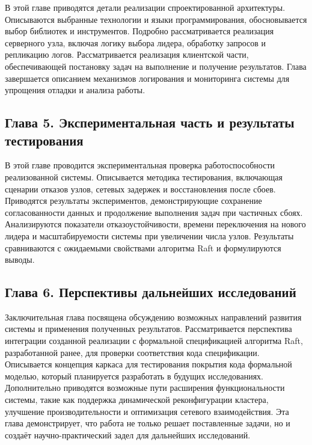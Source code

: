 В этой главе приводятся детали реализации спроектированной архитектуры.
Описываются выбранные технологии и языки программирования, обосновывается выбор
библиотек и инструментов. Подробно рассматривается реализация серверного узла,
включая логику выбора лидера, обработку запросов и репликацию логов.
Рассматривается реализация клиентской части, обеспечивающей постановку задач на
выполнение и получение результатов. Глава завершается описанием механизмов
логирования и мониторинга системы для упрощения отладки и анализа работы.

\subsection*{Глава 5. Экспериментальная часть и результаты тестирования}

В этой главе проводится экспериментальная проверка работоспособности
реализованной системы. Описывается методика тестирования, включающая сценарии
отказов узлов, сетевых задержек и восстановления после сбоев. Приводятся
результаты экспериментов, демонстрирующие сохранение согласованности данных и
продолжение выполнения задач при частичных сбоях. Анализируются показатели
отказоустойчивости, времени переключения на нового лидера и масштабируемости
системы при увеличении числа узлов. Результаты сравниваются с ожидаемыми
свойствами алгоритма Raft и формулируются выводы.

\subsection*{Глава 6. Перспективы дальнейших исследований}

Заключительная глава посвящена обсуждению возможных направлений развития
системы и применения полученных результатов. Рассматривается перспектива
интеграции созданной реализации с формальной спецификацией алгоритма Raft,
разработанной ранее, для проверки соответствия кода спецификации. Описывается
концепция каркаса для тестирования покрытия кода формальной моделью, который
планируется разработать в будущих исследованиях. Дополнительно приводятся
возможные пути расширения функциональности системы, такие как поддержка
динамической реконфигурации кластера, улучшение производительности и
оптимизация сетевого взаимодействия. Эта глава демонстрирует, что работа не
только решает поставленные задачи, но и создаёт научно-практический задел для
дальнейших исследований.
